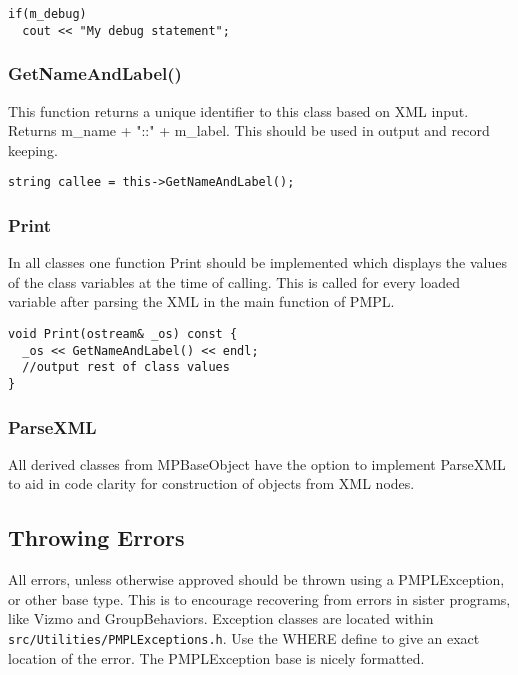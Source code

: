\documentclass[12pt]{article}
\begin{document}
\begin{lstlisting}
if(m_debug)
  cout << "My debug statement";
\end{lstlisting}

\subsubsection{GetNameAndLabel()}

This function returns a unique identifier to this class based on XML input.
Returns m\_name + "::" + m\_label. This should be used in output and record
keeping.

\begin{lstlisting}
string callee = this->GetNameAndLabel();
\end{lstlisting}

\subsubsection{Print}

In all classes one function Print should be implemented which displays the
values of the class variables at the time of calling. This is called for every
loaded variable after parsing the XML in the main function of PMPL.

\begin{lstlisting}
void Print(ostream& _os) const {
  _os << GetNameAndLabel() << endl;
  //output rest of class values
}
\end{lstlisting}

\subsubsection{ParseXML}

All derived classes from MPBaseObject have the option to implement ParseXML to
aid in code clarity for construction of objects from XML nodes.

\subsection{Throwing Errors}

All errors, unless otherwise approved should be thrown using a PMPLException, or
other base type. This is to encourage recovering from errors in sister programs,
like Vizmo and GroupBehaviors. Exception classes are located within
\texttt{src/Utilities/PMPLExceptions.h}. Use the WHERE define to give an exact
location of the error. The PMPLException base is nicely formatted.
\end{document}
